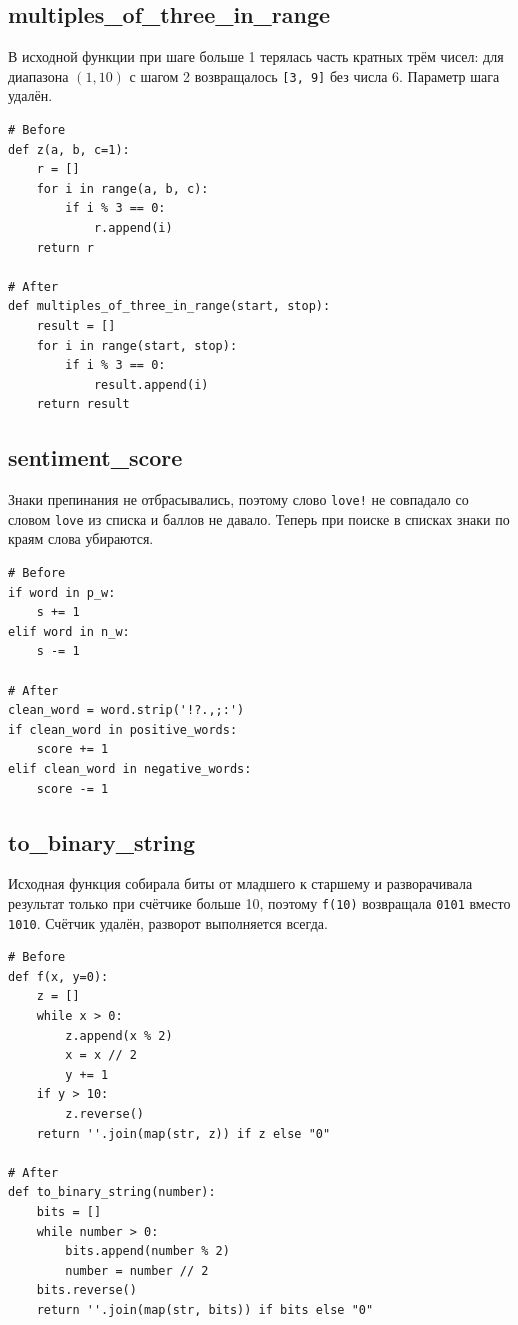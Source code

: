 \documentclass[a4paper,12pt]{article}
\begin{document}
\subsection{multiples\_of\_three\_in\_range}

В исходной функции при шаге больше 1 терялась часть кратных трём чисел: для диапазона $(1, 10)$ с шагом 2 возвращалось \texttt{[3, 9]} без числа 6. Параметр шага удалён.

\begin{lstlisting}
# Before
def z(a, b, c=1):
    r = []
    for i in range(a, b, c):
        if i % 3 == 0:
            r.append(i)
    return r

# After
def multiples_of_three_in_range(start, stop):
    result = []
    for i in range(start, stop):
        if i % 3 == 0:
            result.append(i)
    return result
\end{lstlisting}

\subsection{sentiment\_score}

Знаки препинания не отбрасывались, поэтому слово \texttt{love!} не совпадало со словом \texttt{love} из списка и баллов не давало. Теперь при поиске в списках знаки по краям слова убираются.

\begin{lstlisting}
# Before
if word in p_w:
    s += 1
elif word in n_w:
    s -= 1

# After
clean_word = word.strip('!?.,;:')
if clean_word in positive_words:
    score += 1
elif clean_word in negative_words:
    score -= 1
\end{lstlisting}

\subsection{to\_binary\_string}

Исходная функция собирала биты от младшего к старшему и разворачивала результат только при счётчике больше 10, поэтому \texttt{f(10)} возвращала \texttt{0101} вместо \texttt{1010}. Счётчик удалён, разворот выполняется всегда.

\begin{lstlisting}
# Before
def f(x, y=0):
    z = []
    while x > 0:
        z.append(x % 2)
        x = x // 2
        y += 1
    if y > 10:
        z.reverse()
    return ''.join(map(str, z)) if z else "0"

# After
def to_binary_string(number):
    bits = []
    while number > 0:
        bits.append(number % 2)
        number = number // 2
    bits.reverse()
    return ''.join(map(str, bits)) if bits else "0"
\end{lstlisting}
\end{document}
